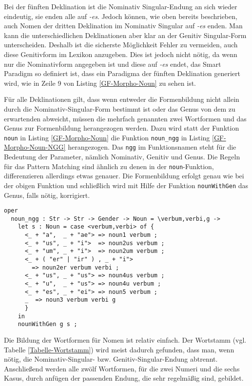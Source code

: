 Bei der fünften Deklination ist die Nominativ Singular-Endung an sich wieder eindeutig, sie enden alle auf \textit{-es}. Jedoch können, wie oben bereits beschrieben, auch Nomen der dritten Deklination im Nominativ Singular auf \textit{-es} enden. Man kann die unterschiedlichen Deklinationen aber klar an der Genitiv Singular-Form unterscheiden. Deshalb ist die sicherste Möglichkeit Fehler zu vermeiden, auch diese Genitivform im Lexikon anzugeben. Dies ist jedoch nicht nötig, da wenn nur die Nominativform angegeben ist und diese auf \textit{-es} endet, das Smart Paradigm so definiert ist, dass ein Paradigma der fünften Deklination generiert wird, wie in Zeile 9 von Listing \ref{GF-Morpho-Noun} zu sehen ist. \par
Für alle Deklinationen gilt, dass wenn entweder die Formenbildung nicht allein durch die Nominativ-Singular-Form bestimmt ist oder das Genus von dem zu erwartenden abweicht, müssen die mehrfach genannten zwei Wortformen und das Genus zur Formenbildung herangezogen werden. Dazu wird statt der Funktion \texttt{noun} in Listing \ref{GF-Morpho-Noun} die Funktion \texttt{noun\_ngg} in Listing \ref{GF-Morpho-Noun-NGG} herangezogen. Das \texttt{ngg} im Funktionsnamen steht für die Bedeutung der Parameter, nämlich Nominativ, Genitiv und Genus. Die Regeln für das Pattern Matching sind ähnlich zu denen in der \texttt{noun}-Funktion, differenzieren allerdings etwas genauer. Die Formenbildung erfolgt genau wie bei der obigen Funktion und schließlich wird mit Hilfe der Funktion \texttt{nounWithGen} das Genus, falls nötig, korrigiert.
\begin{lstlisting}[float=h!tp,caption={Smart Paradigm für zwei Nomenformen und Genus (vgl. \textbf{MorphoLat.gf})},label={GF-Morpho-Noun-NGG}]
oper
  noun_ngg : Str -> Str -> Gender -> Noun = \verbum,verbi,g -> 
    let s : Noun = case <verbum,verbi> of {
      <_ + "a",  _ + "ae"> => noun1 verbum ;
      <_ + "us", _ + "i">  => noun2us verbum ;
      <_ + "um", _ + "i">  => noun2um verbum ;
      <_ + ( "er" | "ir" ) , _ + "i">  
        => noun2er verbum verbi ;
      <_ + "us", _ + "us"> => noun4us verbum ;
      <_ + "u",  _ + "us"> => noun4u verbum ;
      <_ + "es", _ + "ei"> => noun5 verbum ;
      _  => noun3 verbum verbi g
      }
    in  
    nounWithGen g s ;
\end{lstlisting}
Die Bildung der Wortformen für Nomen ist relativ einfach. Der Wortstamm (vgl. Tabelle \ref{Tabelle-Wortstamm}) wird meist dadurch gefunden, dass man, wenn nötig, die Nominativ-Singular- bzw. Genitiv-Singular-Endung abtrennt. Anschließend werden alle zwölf Wortformen, für die zwei Numeri und die sechs Kasus, durch anfügen der passenden Endung, die sehr regelmäßig sind, gebildet. \par
